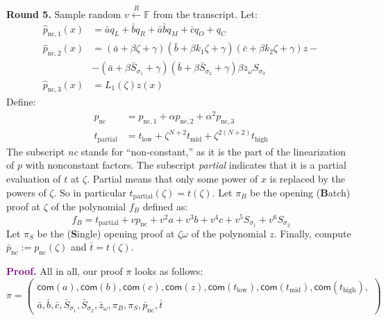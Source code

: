 \documentclass[../lecture-notes.tex]{subfiles}
\begin{document}
\textcolor{green!60!black}{\textbf{Round 5.}} Sample random $v \xleftarrow{R}
\mathbb{F}$ from the transcript. Let:
\begin{equation*}    
    \begin{aligned}
        \hat{p}_{\text{nc},1}(x) &= \bar{a}q_L + \bar{b}q_R + \bar{a}\bar{b}q_M + \bar{c}q_O + q_C \\
        \hat{p}_{\text{nc},2}(x) &= (\bar{a} + \beta \zeta + \gamma)(\bar{b} + \beta k_1 \zeta + \gamma)(\bar{c} + \beta k_2 \zeta + \gamma) z - \\
                                 &- (\bar{a} + \beta \bar{S}_{\sigma_1} + \gamma)(\bar{b} + \beta \bar{S}_{\sigma_2} + \gamma)\beta \overline{z}_{\omega}S_{\sigma_3} \\
        \hat{p}_{\text{nc},3}(x) &= L_1(\zeta)z(x)
    \end{aligned}
\end{equation*}
Define:
\begin{align*}
p_{\text{nc}} &= p_{\text{nc},1} + \alpha p_{\text{nc}, 2} + \alpha^2 p_{\text{nc}, 3} \\
t_{\text{partial}} &= t_{\text{low}} + \zeta^{N+2}t_{\text{mid}} + \zeta^{2(N+2)}t_{\text{high}}
\end{align*}
The subscript \emph{nc} stands for ``non-constant,'' as it is the part of the
linearization of $p$ with nonconstant factors. The subscript \emph{partial} indicates
that it is a partial evaluation of $t$ at $\zeta$. Partial means that only some
power of $x$ is replaced by the powers of $\zeta$. So in particular
$t_{\text{partial}}(\zeta) = t(\zeta)$. Let $\pi_B$ be the opening (\textbf{B}atch) proof at
$\zeta$ of the polynomial $f_B$ defined as: 
\[
f_B = t_{\text{partial}} + v p_{\text{nc}} + v^2 a + v^3 b + v^4 c + v^5 S_{\sigma_1} + v^6 S_{\sigma_2}
\]
Let $\pi_{S}$ be the (\textbf{S}ingle) opening proof at $\zeta\omega$ of the polynomial
$z$. Finally, compute $\bar{p}_{\text{nc}} := p_{\text{nc}}(\zeta)$ and $\bar{t} = t(\zeta)$.

\textcolor{purple}{\textbf{Proof.}} All in all, our proof $\pi$ looks as follows:
\begin{equation*}
    \pi = \begin{pmatrix}\mathsf{com}(a), \mathsf{com}(b), \mathsf{com}(c), \mathsf{com}(z), \mathsf{com}(t_{\text{low}}), \mathsf{com}(t_{\text{mid}}), \mathsf{com}(t_{\text{high}}), \\
        \bar{a}, \bar{b}, \bar{c}, \bar{S}_{\sigma_1}, \bar{S}_{\sigma_2}, \bar{z}_{\omega}, \pi_{B}, \pi_{S}, \bar{p}_{\text{nc}}, \bar{t}
    \end{pmatrix}
\end{equation*}
\end{document}
